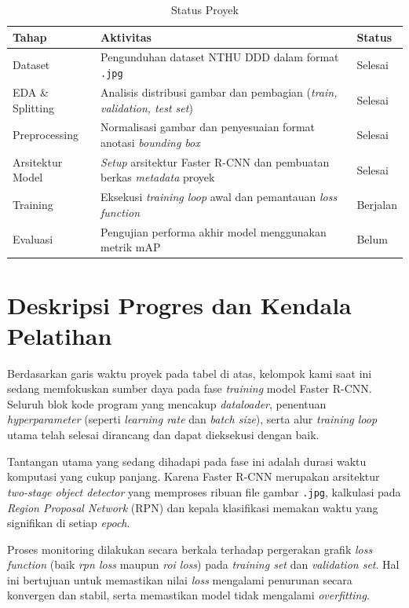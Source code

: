 \documentclass[11pt,a4paper,oneside]{report}
\begin{document}
\begin{table}[h!]
\centering
\begin{tabularx}{\textwidth}{lXl}
\toprule
Tahap & Aktivitas & Status \\
\midrule
Dataset & Pengunduhan dataset NTHU DDD dalam format \texttt{.jpg} & Selesai \\
EDA \& Splitting & Analisis distribusi gambar dan pembagian (\textit{train, validation, test set}) & Selesai \\
Preprocessing & Normalisasi gambar dan penyesuaian format anotasi \textit{bounding box} & Selesai \\
Arsitektur Model & \textit{Setup} arsitektur Faster R-CNN dan pembuatan berkas \textit{metadata} proyek & Selesai \\
Training & Eksekusi \textit{training loop} awal dan pemantauan \textit{loss function} & Berjalan \\
Evaluasi & Pengujian performa akhir model menggunakan metrik mAP & Belum \\
\bottomrule
\end{tabularx}
\caption{Status Proyek}
\end{table}

\section{Deskripsi Progres dan Kendala Pelatihan}

Berdasarkan garis waktu proyek pada tabel di atas, kelompok kami saat ini sedang memfokuskan sumber daya pada fase \textit{training} model Faster R-CNN. Seluruh blok kode program yang mencakup \textit{dataloader}, penentuan \textit{hyperparameter} (seperti \textit{learning rate} dan \textit{batch size}), serta alur \textit{training loop} utama telah selesai dirancang dan dapat dieksekusi dengan baik. 

Tantangan utama yang sedang dihadapi pada fase ini adalah durasi waktu komputasi yang cukup panjang. Karena Faster R-CNN merupakan arsitektur \textit{two-stage object detector} yang memproses ribuan file gambar \texttt{.jpg}, kalkulasi pada \textit{Region Proposal Network} (RPN) dan kepala klasifikasi memakan waktu yang signifikan di setiap \textit{epoch}. 

Proses monitoring dilakukan secara berkala terhadap pergerakan grafik \textit{loss function} (baik \textit{rpn loss} maupun \textit{roi loss}) pada \textit{training set} dan \textit{validation set}. Hal ini bertujuan untuk memastikan nilai \textit{loss} mengalami penurunan secara konvergen dan stabil, serta memastikan model tidak mengalami \textit{overfitting}.
\end{document}
